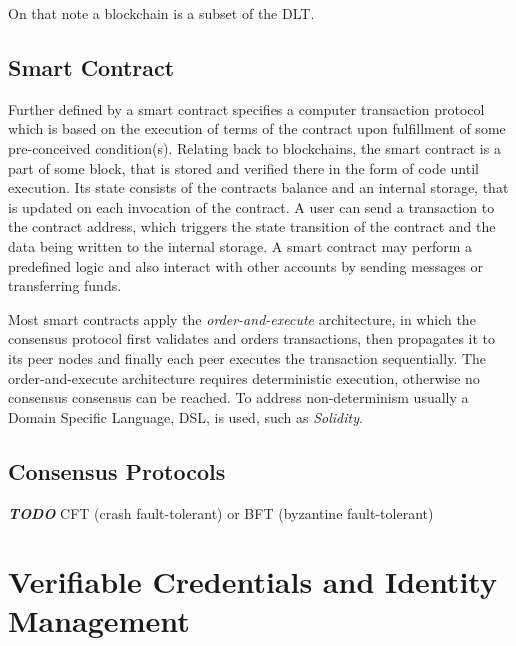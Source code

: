 On that note a blockchain is a subset of the DLT. \cite{diam-iot-2020}

\subsection{Smart Contract} %
\label{sec:Smart Contract}
Further defined by \cite{diam-iot-2020} a smart contract specifies a computer transaction protocol which is based on the
execution of terms of the contract upon fulfillment of some pre-conceived condition(s).
Relating back to blockchains, the smart contract is a part of some block, that is stored and verified there in the form
of code until execution. Its state consists of the contracts balance and an internal storage, that is updated on each
invocation of the contract. A user can send a transaction to the contract address, which triggers the state transition
of the contract and the data being written to the internal storage. A smart contract may perform a predefined logic and
also interact with other accounts by sending messages or transferring funds.

Most smart contracts apply the \textit{order-and-execute} architecture, in which the consensus protocol first validates
and orders transactions, then propagates it to its peer nodes and finally each peer executes the transaction
sequentially. The order-and-execute architecture requires deterministic execution, otherwise no consensus consensus can
be reached. To address non-determinism usually a Domain Specific Language, DSL, is used, such as \textit{Solidity}.

\subsection{Consensus Protocols} %
\label{sub:Consensus Protocols}
\textbf{\textit{TODO}}
CFT (crash fault-tolerant) or BFT (byzantine fault-tolerant)

\section{Verifiable Credentials and Identity Management} %
\label{sec:Verifiable Credentials and Identity Management}

